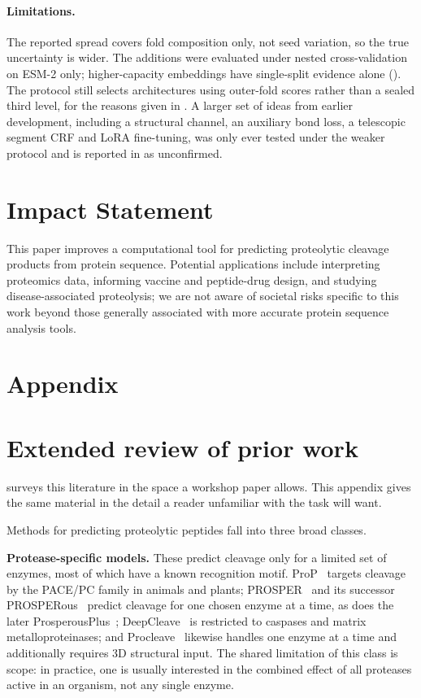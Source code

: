 \documentclass{article}
\begin{document}
\paragraph{Limitations.} The reported spread covers fold composition only, not seed variation, so the true uncertainty is wider. The additions were evaluated under nested cross-validation on ESM-2 only; higher-capacity embeddings have single-split evidence alone (). The protocol still selects architectures using outer-fold scores rather than a sealed third level, for the reasons given in . A larger set of ideas from earlier development, including a structural channel, an auxiliary bond loss, a telescopic segment CRF and LoRA fine-tuning, was only ever tested under the weaker protocol and is reported in  as unconfirmed.




\section*{Impact Statement}
This paper improves a computational tool for predicting proteolytic cleavage products from protein sequence. Potential applications include interpreting proteomics data, informing vaccine and peptide-drug design, and studying disease-associated proteolysis; we are not aware of societal risks specific to this work beyond those generally associated with more accurate protein sequence analysis tools.
\newpage
\appendix
\section*{Appendix}

\section{Extended review of prior work}
\label{sec:app-related}

 surveys this literature in the space a workshop paper allows. This appendix
gives the same material in the detail a reader unfamiliar with the task will want.


Methods for predicting proteolytic peptides fall into three broad classes.

\textbf{Protease-specific models.} These predict cleavage only for a limited set of enzymes, most of which have a known recognition motif. ProP~\citep{duckert2004prop} targets cleavage by the PACE/PC family in animals and plants; PROSPER~\citep{song2012prosper} and its successor PROSPERous~\citep{song2018prosperous} predict cleavage for one chosen enzyme at a time, as does the later ProsperousPlus~\citep{li2023prosperousplus}; DeepCleave~\citep{li2020deepcleave} is restricted to caspases and matrix metalloproteinases; and Procleave~\citep{li2020procleave} likewise handles one enzyme at a time and additionally requires 3D structural input. The shared limitation of this class is scope: in practice, one is usually interested in the combined effect of all proteases active in an organism, not any single enzyme.
\end{document}
